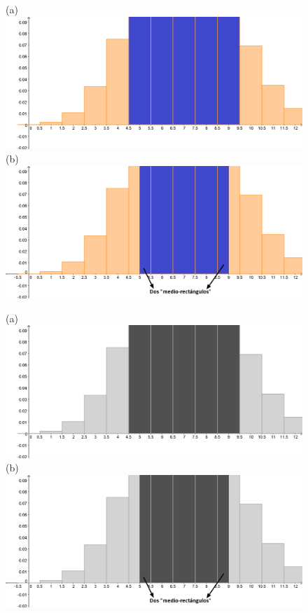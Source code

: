 \begin{figure}[p]
\begin{center}
\begin{enColor}
(a)\\[3mm]
\includegraphics[width=13cm]{../fig/cap05-correccioncontinuidad.png}\\[5mm]
(b)\\[3mm]
\includegraphics[width=13cm]{../fig/cap05-correccioncontinuidad-2.png}
\end{enColor}
\begin{bn}
(a)\\[3mm]
\includegraphics[width=13cm]{../fig/cap05-correccioncontinuidad-bn.png}\\[5mm]
(b)\\[3mm]
\includegraphics[width=13cm]{../fig/cap05-correccioncontinuidad-2-bn.png}


\end{bn}
\end{center}
\end{figure}
